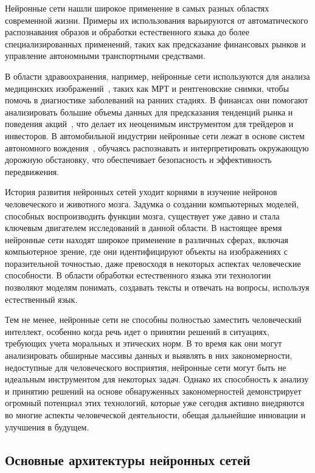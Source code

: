 Нейронные сети нашли широкое применение в самых разных областях современной жизни. Примеры их использования варьируются от автоматического распознавания образов и обработки естественного языка до более специализированных применений, таких как предсказание финансовых рынков и управление автономными транспортными средствами.

В области здравоохранения, например, нейронные сети используются для анализа медицинских изображений~\cite{mrt_neural}, таких как МРТ и рентгеновские снимки, чтобы помочь в диагностике заболеваний на ранних стадиях. В финансах они помогают анализировать большие объемы данных для предсказания тенденций рынка и поведения акций~\cite{busines_neural}, что делает их неоценимым инструментом для трейдеров и инвесторов. В автомобильной индустрии нейронные сети лежат в основе систем автономного вождения~\cite{car_neural}, обучаясь распознавать и интерпретировать окружающую дорожную обстановку, что обеспечивает безопасность и эффективность передвижения.

История развития нейронных сетей уходит корнями в изучение нейронов человеческого и животного мозга. Задумка о создании компьютерных моделей, способных воспроизводить функции мозга, существует уже давно и стала ключевым двигателем исследований в данной области. В настоящее время нейронные сети находят широкое применение в различных сферах, включая компьютерное зрение, где они идентифицируют объекты на изображениях с поразительной точностью, даже превосходя в некоторых аспектах человеческие способности. В области обработки естественного языка эти технологии позволяют моделям понимать, создавать тексты и отвечать на вопросы, используя естественный язык.

Тем не менее, нейронные сети не способны полностью заместить человеческий интеллект, особенно когда речь идет о принятии решений в ситуациях, требующих учета моральных и этических норм. В то время как они могут анализировать обширные массивы данных и выявлять в них закономерности, недоступные для человеческого восприятия, нейронные сети могут быть не идеальным инструментом для некоторых задач. Однако их способность к анализу и принятию решений на основе обнаруженных закономерностей демонстрирует огромный потенциал этих технологий, которые уже сегодня активно внедряются во многие аспекты человеческой деятельности, обещая дальнейшие инновации и улучшения в будущем.

\subsection{Основные архитектуры нейронных сетей}

